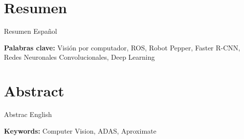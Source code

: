 \chapter*{Resumen}
\thispagestyle{empty}

Resumen Español

\bigskip

\textbf{Palabras clave: } \scriptKeywords Visión por computador, ROS, Robot Pepper, Faster R-CNN, Redes Neuronales Convolucionales, Deep Learning

\clearpage
\chapter*{Abstract}
\thispagestyle{empty}


Abstrac English

\bigskip

\textbf{Keywords:} Computer Vision, ADAS, Aproximate 

\cleardoublepage

